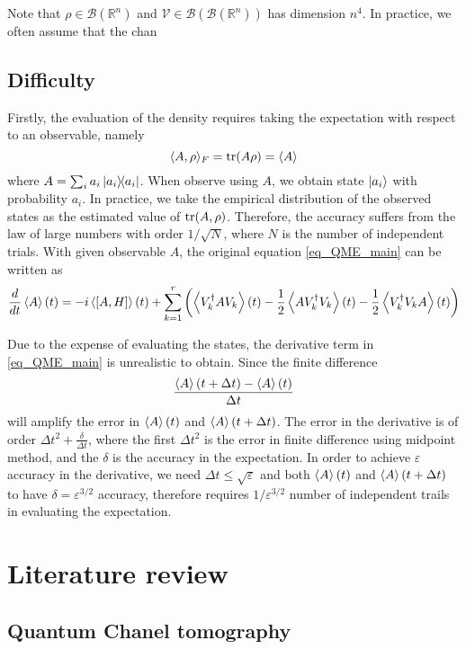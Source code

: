 \documentclass[10pt]{article}  %
\theoremstyle{plain}
\numberwithin{equation}{section}
\newcommand{\innerp}[1]{\langle{#1}\rangle}
\def\mV{\mathcal{V}}
\def\mB{\mathcal{B}}
\def\R{\mathbb{R}}
\begin{document}
Note that $\rho \in \mB(\R^n)$ and $\mV \in \mB(\mB(\R^n))$ has dimension $n^4$. In practice, we often assume that the chan
\subsection{Difficulty}
Firstly, the evaluation of the density requires taking the expectation with respect to an observable, namely
$$ \innerp{A, \rho}_F = \tr(A \rho) = \expval{A}$$
where $A = \sum_i a_i \ketbra{a_i}{a_i}$. When observe using $A$, we obtain state $\ket{a_i}$ with probability $a_i$. In practice, we take the empirical distribution of the observed states as the estimated value of $\tr(A, \rho)$. Therefore, the accuracy suffers from the law of large numbers with order $1/\sqrt{N}$, where $N$ is the number of independent trials. With given observable $A$, the original equation \eqref{eq_QME_main} can be written as 
\begin{equation}
	\frac{d}{dt} \expval{A}(t) = -i\expval{[A, H]}(t) + \sum_{k = 1}^r \left(\expval{V_k^\dagger A V_k}(t) - \frac{1}{2} \expval{A V_k^\dagger V_k} (t) - \frac{1}{2} \expval{V_k^\dagger V_k A}(t) \right)
\end{equation}



Due to the expense of evaluating the states, the derivative term in \eqref{eq_QME_main} is unrealistic to obtain. Since the finite difference 
$$ \frac{\expval{A}(t + \Delta t) - \expval{A}(t)}{\Delta t} $$ 
will amplify the error in $\expval{A}(t)$ and $\expval{A}(t + \Delta t)$. The error in the derivative is of order $\Delta t^2 + \frac{\delta}{\Delta t}$, where the first $\Delta t^2 $ is the error in finite difference using midpoint method, and the $\delta$ is the accuracy in the expectation. In order to achieve $\varepsilon$ accuracy in the derivative, we need $\Delta t \leq \sqrt{\varepsilon}$ and both $\expval{A}(t)$ and $\expval{A}(t + \Delta t)$ to have $\delta = \varepsilon^{3/2}$ accuracy, therefore requires $1/\varepsilon^{3/2}$ number of independent trails in evaluating the expectation.



\section{Literature review}

\subsection{Quantum Chanel tomography}
\end{document}
